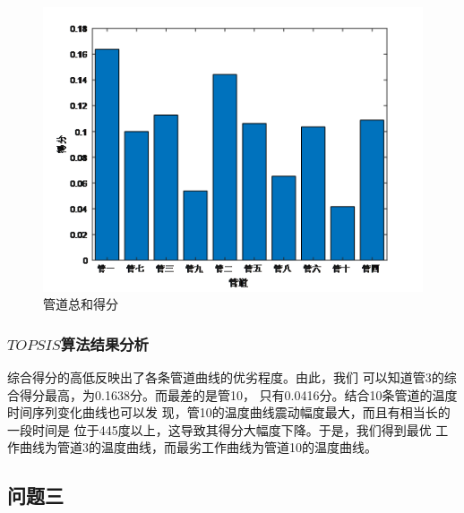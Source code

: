             \begin{figure}
                \includegraphics{figures/管道综合得分.png}
                \caption{管道总和得分}
                \label{综合得分}
            \end{figure}
        \subsubsection{$TOPSIS$算法结果分析}
        综合得分的高低反映出了各条管道曲线的优劣程度。由此，我们
        可以知道管3的综合得分最高，为0.1638分。而最差的是管10，
        只有0.0416分。结合10条管道的温度时间序列变化曲线也可以发
        现，管10的温度曲线震动幅度最大，而且有相当长的一段时间是
        位于445度以上，这导致其得分大幅度下降。于是，我们得到最优
        工作曲线为管道3的温度曲线，而最劣工作曲线为管道10的温度曲线。
    \subsection{问题三}

